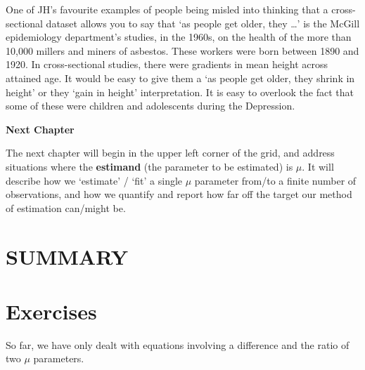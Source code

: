 \documentclass[]{book}
\begin{document}
One of JH's favourite examples of people being misled into thinking that a cross-sectional dataset allows you to say that `as people get older, they \ldots{}' is the McGill epidemiology department's studies, in the 1960s, on the health of the more than 10,000 millers and miners of asbestos. These workers were born between 1890 and 1920. In cross-sectional studies, there were gradients in mean height across attained age. It would be easy to give them a `as people get older, they shrink in height' or they `gain in height' interpretation. It is easy to overlook the fact that some of these were children and adolescents during the Depression.

\textbf{Next Chapter}

The next chapter will begin in the upper left corner of the grid, and address situations where the \textbf{estimand} (the parameter to be estimated) is \(\mu.\) It will describe how we `estimate' / `fit' a single \(\mu\) parameter from/to a finite number of observations, and how we quantify and report how far off the target our method of estimation can/might be.

\hypertarget{summary}{%
\section{SUMMARY}\label{summary}}

\hypertarget{exercises}{%
\section{Exercises}\label{exercises}}

So far, we have only dealt with equations involving a difference and the ratio of two \(\mu\) parameters.
\end{document}
